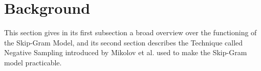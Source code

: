 
\section{Background}\label{chap:background}

This section gives in its first subsection a broad overview over the functioning of the Skip-Gram Model, and its second section describes the Technique called Negative Sampling introduced by Mikolov et al. \cite{mikolov2} used to make the Skip-Gram model practicable.
